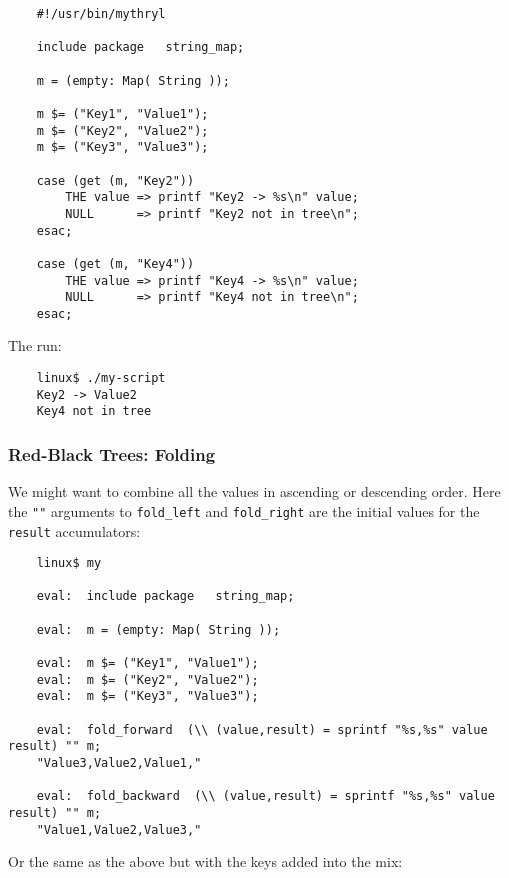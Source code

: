\begin{verbatim}
    #!/usr/bin/mythryl

    include package   string_map;

    m = (empty: Map( String ));

    m $= ("Key1", "Value1");
    m $= ("Key2", "Value2");
    m $= ("Key3", "Value3");

    case (get (m, "Key2"))
        THE value => printf "Key2 -> %s\n" value;
        NULL      => printf "Key2 not in tree\n";
    esac;

    case (get (m, "Key4"))
        THE value => printf "Key4 -> %s\n" value;
        NULL      => printf "Key4 not in tree\n";
    esac;
\end{verbatim}

The run:

\begin{verbatim}
    linux$ ./my-script
    Key2 -> Value2
    Key4 not in tree
\end{verbatim}


\cutend*

\subsubsection{Red-Black Trees:  Folding}

We might want to combine all the values in ascending or descending order. 
Here the {\tt ""} arguments to {\tt fold\_left} and {\tt fold\_right} are 
the initial values for the {\tt result} accumulators:

\begin{verbatim}
    linux$ my

    eval:  include package   string_map;

    eval:  m = (empty: Map( String ));

    eval:  m $= ("Key1", "Value1");
    eval:  m $= ("Key2", "Value2");
    eval:  m $= ("Key3", "Value3");

    eval:  fold_forward  (\\ (value,result) = sprintf "%s,%s" value result) "" m;
    "Value3,Value2,Value1,"

    eval:  fold_backward  (\\ (value,result) = sprintf "%s,%s" value result) "" m;
    "Value1,Value2,Value3,"
\end{verbatim}

Or the same as the above but with the keys added into the mix:

